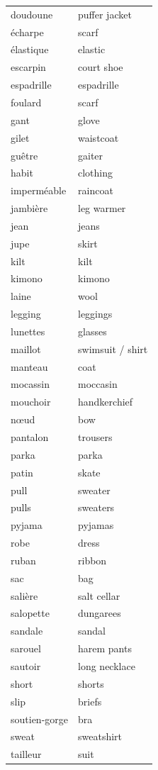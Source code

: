 \documentclass[12pt,a4paper]{article}
\begin{document}
\begin{longtable}{p{4cm} p{6cm}}
doudoune & puffer jacket \\
écharpe & scarf \\
élastique & elastic \\
escarpin & court shoe \\
espadrille & espadrille \\
foulard & scarf \\
gant & glove \\
gilet & waistcoat \\
guêtre & gaiter \\
habit & clothing \\
imperméable & raincoat \\
jambière & leg warmer \\
jean & jeans \\
jupe & skirt \\
kilt & kilt \\
kimono & kimono \\
laine & wool \\
legging & leggings \\
lunettes & glasses \\
maillot & swimsuit / shirt \\
manteau & coat \\
mocassin & moccasin \\
mouchoir & handkerchief \\
nœud & bow \\
pantalon & trousers \\
parka & parka \\
patin & skate \\
pull & sweater \\
pulls & sweaters \\
pyjama & pyjamas \\
robe & dress \\
ruban & ribbon \\
sac & bag \\
salière & salt cellar \\
salopette & dungarees \\
sandale & sandal \\
sarouel & harem pants \\
sautoir & long necklace \\
short & shorts \\
slip & briefs \\
soutien-gorge & bra \\
sweat & sweatshirt \\
tailleur & suit \\

\end{longtable}
\end{document}
